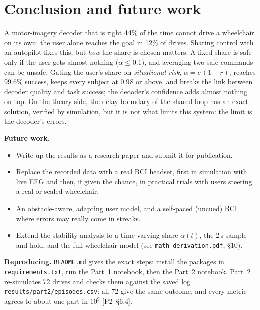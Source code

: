 \documentclass[11pt,a4paper]{article}
\newcommand{\ptwo}[1]{{\small\textsf{[P2~\S#1]}}}
\newcommand{\code}[1]{\texttt{#1}}
\begin{document}
\section{Conclusion and future work}
A motor-imagery decoder that is right 44\% of the time cannot drive a
wheelchair on its own: the user alone reaches the goal in 12\% of drives.
Sharing control with an autopilot fixes this, but \emph{how} the share is
chosen matters. A fixed share is safe only if the user gets almost
nothing ($\alpha \le 0.1$), and averaging two safe commands can be
unsafe. Gating the user's share on \emph{situational risk},
$\alpha = c\,(1-r)$, reaches 99.6\% success, keeps every subject at 0.98
or above, and breaks the link between decoder quality and task success;
the decoder's confidence adds almost nothing on top. On the theory side,
the delay boundary of the shared loop has an exact solution, verified by
simulation, but it is not what limits this system: the limit is the
decoder's errors.

\textbf{Future work.}
\begin{itemize}\setlength{\itemsep}{2pt}
\item Write up the results as a research paper and submit it for
publication.
\item Replace the recorded data with a real BCI headset, first in
simulation with live EEG and then, if given the chance, in practical
trials with users steering a real or scaled wheelchair.
\item An obstacle-aware, adapting user model, and a self-paced (uncued)
BCI where errors may really come in streaks.
\item Extend the stability analysis to a time-varying share $\alpha(t)$,
the 2\,s sample-and-hold, and the full wheelchair model
(see \code{math\_derivation.pdf}, \S10).
\end{itemize}

\textbf{Reproducing.} \code{README.md} gives the exact steps: install the
packages in \code{requirements.txt}, run the Part~1 notebook, then the
Part~2 notebook. Part~2 re-simulates 72 drives and checks them against the
saved log \code{results/part2/episodes.csv}: all 72 give the same outcome,
and every metric agrees to about one part in $10^{9}$ \ptwo{6.4}.
\end{document}
